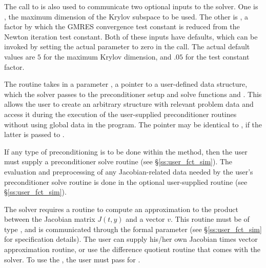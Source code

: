 \begin{itemize}
  The call to  is also used to communicate two optional
  inputs to the {\cvspgmr} solver.  One is , the maximum dimension
  of the Krylov subspace to be used.  The other is , a factor
  by which the GMRES convergence test constant is reduced
  from the Newton iteration test constant.  Both of these inputs have defaults,
  which can be invoked by setting the actual parameter to zero in the
  call.  The actual default values are $5$ for the maximum Krylov
  dimension, and $.05$ for the test constant factor.
  
  The routine  takes in a parameter
  , a pointer to a user-defined data structure, which
  the {\cvspgmr} solver passes to the preconditioner setup and solve
  functions  and .  This allows the user to
  create an arbitrary structure with relevant problem data and access it
  during the execution of the user-supplied preconditioner routines
  without using global data in the program.  The pointer 
  may be identical to , if the latter is passed to
  .
  
  If any type of preconditioning is to be done within the {\spgmr} method,
  then the user must supply a preconditioner solve routine 
  (see \S\ref{ss:user_fct_sim}).
  The evaluation and preprocessing of any Jacobian-related data needed
  by the user's preconditioner solve routine is done in the optional
  user-supplied routine 
  (see \S\ref{ss:user_fct_sim}).
  
  The 
  {\cvspgmr} solver requires a routine to compute an approximation to the
  product between the Jacobian matrix $J(t,y)$ and a vector $v$.
  This routine must be of type , and is communicated through
  the  formal parameter  (see \S\ref{ss:user_fct_sim} for
  specification details).
  The user can supply his/her own Jacobian times vector approximation routine, 
  or use the difference quotient routine  
  that comes with the {\cvspgmr} solver.  To use the , the user 
  must pass  for .
  

\end{itemize}
